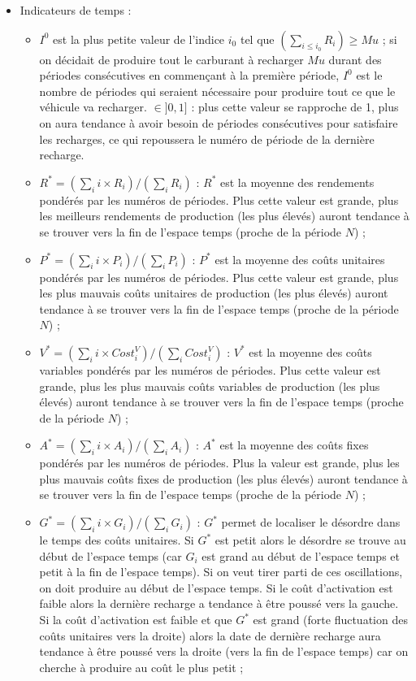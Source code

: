 \begin{itemize}[label=$\square$]
\item	Indicateurs de temps : 
\begin{itemize}
\item	$I^0 $ est la plus petite valeur de l'indice $i_0$ tel que $(\sum_{i \leq i_0} R_i) \geq Mu$ ; si on décidait de produire tout le carburant à recharger $Mu$ durant des périodes consécutives en commençant à la première période, $I^0$ est le nombre de périodes qui seraient nécessaire pour produire tout ce que le véhicule va recharger.  $\in ]0,1]$ : plus cette valeur se rapproche de 1, plus on aura tendance à avoir besoin de périodes consécutives pour satisfaire les recharges, ce qui repoussera le numéro de période de la dernière recharge. 
\item	$R^* = (\sum_i i \times R_i)/(\sum_i R_i)$ : $R^*$ est la moyenne des rendements pondérés par les numéros de périodes. Plus cette valeur est grande, plus les meilleurs rendements de production (les plus élevés) auront tendance à se trouver vers la fin de l'espace temps (proche de la période $N$) ;
\item	$P^* = (\sum_i i\times P_i)/(\sum_i P_i)$ : $P^*$ est la moyenne des coûts unitaires pondérés par les numéros de périodes. Plus cette valeur est grande, plus les plus mauvais coûts unitaires de production (les plus élevés) auront tendance à se trouver vers la fin de l'espace temps (proche de la période $N$) ;
\item	$V^* = (\sum_i i \times Cost_i^V)/(\sum_i Cost_i^V)$ : $V^*$ est la moyenne des coûts variables pondérés par les numéros de périodes. Plus cette valeur est grande, plus les plus mauvais coûts variables de production (les plus élevés) auront tendance à se trouver vers la fin de l'espace temps (proche de la période $N$) ;
\item	$A^* = (\sum_i i\times A_i)/(\sum_i A_i)$ :  $A^*$ est la moyenne des coûts fixes pondérés par les numéros de périodes. Plus la valeur  est grande, plus les plus mauvais coûts fixes de production (les plus élevés) auront tendance à se trouver vers la fin de l'espace temps (proche de la période $N$) ;
\item	$G^* = (\sum_i i \times G_i)/(\sum_i G_i)$ :  $G^*$ permet de localiser le désordre dans le temps des coûts unitaires. Si $G^*$ est petit alors le désordre se trouve au début de l'espace temps (car $G_i$ est grand au début de l'espace temps et petit à la fin de l'espace temps). Si on veut tirer parti de ces oscillations, on doit produire au début de l'espace temps. Si le coût d'activation est faible alors la dernière recharge a tendance à être poussé vers la gauche. Si la coût d'activation est faible et que $G^*$ est grand (forte fluctuation des coûts unitaires vers la droite) alors la date de dernière recharge aura tendance à être poussé vers la droite (vers la fin de l'espace temps) car on cherche à produire au coût le plus petit ;

\end{itemize}
\end{itemize}
